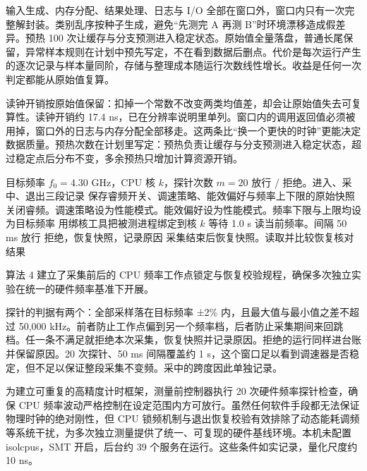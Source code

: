 输入生成、内存分配、结果处理、日志与 I/O 全部在窗口外，窗口内只有一次完整解封装。类别乱序按种子生成，避免“先测完 A 再测 B”时环境漂移造成假差异。预热 100 次让缓存与分支预测进入稳定状态。原始值全量落盘，普通长尾保留，异常样本规则在计划中预先写定，不在看到数据后删点。代价是每次运行产生的逐次记录与样本量同阶，存储与整理成本随运行次数线性增长。收益是任何一次判定都能从原始值复算。

读钟开销按原始值保留：扣掉一个常数不改变两类均值差，却会让原始值失去可复算性。读钟开销约 17.4 ns，已在分辨率说明里单列。窗口内的调用返回值必须被用掉，窗口外的日志与内存分配全部移走。这两条比“换一个更快的时钟”更能决定数据质量。预热次数在计划里写定：预热负责让缓存与分支预测进入稳定状态，超过稳定点后分布不变，多余预热只增加计算资源开销。

\begin{algorithm}[H]
\caption{锁频控制与恢复核对}
\label{alg:frequency}
\begin{algorithmic}[1]
\Require 目标频率 $f_0=4.30$ GHz，CPU 核 $k$，探针次数 $m=20$
\Ensure 放行 / 拒绝。进入、采中、退出三段记录
\State 保存睿频开关、调速策略、能效偏好与频率上下限的原始快照
\State 关闭睿频。调速策略设为性能模式。能效偏好设为性能模式。频率下限与上限均设为目标频率
\State 用绑核工具把被测进程绑定到核 $k$
\State 等待 1.0 s
  \State 读当前频率。间隔 50 ms
\EndFor
{}
  \State 放行
\Else
  \State 拒绝，恢复快照，记录原因
\EndIf
\State 采集结束后恢复快照。读取并比较恢复核对结果
\end{algorithmic}
\end{algorithm}

算法 4 建立了采集前后的 CPU 频率工作点锁定与恢复校验规程，确保多次独立实验在统一的硬件频率基准下开展。

探针的判据有两个：全部采样落在目标频率 ±2\% 内，且最大值与最小值之差不超过 50,000 kHz。前者防止工作点偏到另一个频率档，后者防止采集期间来回跳档。任一条不满足就拒绝本次采集，恢复快照并记录原因。拒绝的运行同样进台账并保留原因。20 次探针、50 ms 间隔覆盖约 1 s，这个窗口足以看到调速器是否稳定，但不足以保证整段采集不变频。采中的跨度因此单独记录。

为建立可重复的高精度计时框架，测量前控制器执行 20 次硬件频率探针检查，确保 CPU 频率波动严格控制在设定范围内方可放行。虽然任何软件手段都无法保证物理时钟的绝对刚性，但 CPU 锁频机制与退出恢复校验有效排除了动态能耗调频等系统干扰，为多次独立测量提供了统一、可复现的硬件基线环境。本机未配置 isolcpus，SMT 开启，后台约 39 个服务在运行。这些条件如实记录，量化尺度约 10 ns。 %

